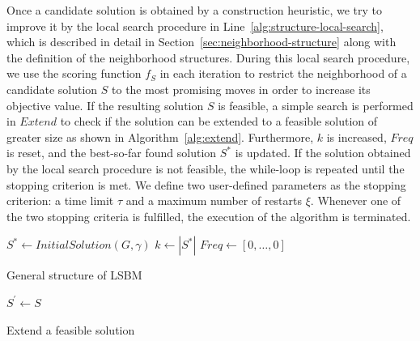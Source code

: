 \documentclass[draft,final]{vutinfth} %
\begin{document}
Once a candidate solution is obtained by a construction heuristic, we try to improve it by the local search procedure in Line~\ref{alg:structure-local-search}, which is described in detail in Section~\ref{sec:neighborhood-structure} along with the definition of the neighborhood structures. During this local search procedure, we use the scoring function $f_S$ in each iteration to restrict the neighborhood of a candidate solution $S$ to the most promising moves in order to increase its objective value. 
If the resulting solution $S$ is feasible, a simple search is performed in $\mathit{Extend}$ to check if the solution can be extended to a feasible solution of greater size as shown in Algorithm~\ref{alg:extend}. 
Furthermore, $k$ is increased, $\mathit{Freq}$ is reset, and the best-so-far found solution $S^*$ is updated. 
If the solution obtained by the local search procedure is not feasible, the while-loop is repeated until the stopping criterion is met. We define two user-defined parameters as the stopping criterion: a time limit $\tau$ and a maximum number of restarts $\xi$. Whenever one of the two stopping criteria is fulfilled, the execution of the algorithm is terminated. 

\begin{algorithm}
    \DontPrintSemicolon
    $S^* \gets \mathit{InitialSolution}(G, \gamma)$ \;
    $k \gets |S^*|$ \; \label{alg:structure-lower-bound}
    $\mathit{Freq} \gets [0, \dots, 0]$ \label{alg:structure-freq}  

    \caption{General structure of LSBM}
    \label{alg:structure}
\end{algorithm}

\begin{algorithm}
    \DontPrintSemicolon
    $S^\prime \gets S$ \;
    \caption{Extend a feasible solution}
    \label{alg:extend}
\end{algorithm}
\end{document}

